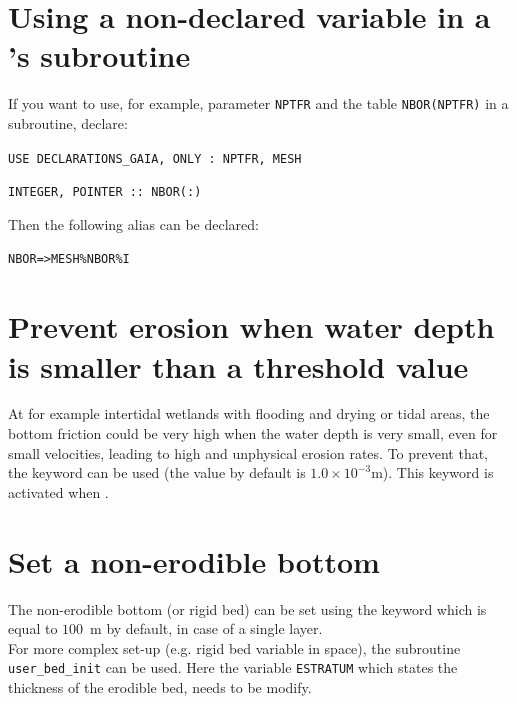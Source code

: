 
\section{Using a non-declared variable in a \gaia{}'s subroutine}
If you want to use, for example, parameter \texttt{NPTFR} and the table \texttt{NBOR(NPTFR)} in a subroutine,
declare:

\texttt{USE DECLARATIONS\_GAIA, ONLY : NPTFR, MESH}

\texttt{INTEGER, POINTER :: NBOR(:)}

Then the following alias can be declared:

\texttt{NBOR=>MESH\%NBOR\%I}

\section{Prevent erosion when water depth is smaller than a threshold value}
At for example intertidal wetlands with flooding and drying or tidal areas, the bottom friction could be very high when the water depth is very small, even for small velocities, leading to high and unphysical erosion rates. To prevent that, the keyword  can be used (the value by default is $1.0 \times 10^{-3}$m). This keyword is activated when .

\section{Set a non-erodible bottom}
The non-erodible bottom (or rigid bed) can be set using the keyword  which is equal to $100$~m by default, in case of a single layer. \\
For more complex set-up (e.g. rigid bed variable in space), the subroutine \texttt{user\_bed\_init} can be used. Here the variable \texttt{ESTRATUM} which states the thickness of the erodible bed, needs to be modify.

